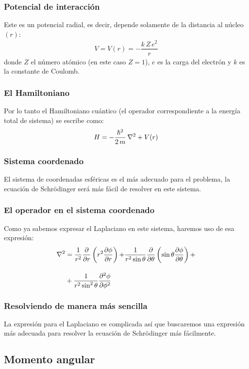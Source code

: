 \documentclass[12pt]{beamer}
\begin{document}
\begin{frame}
\frametitle{Potencial de interacción}
Este es un potencial radial, es decir, depende solamente de la distancia al núcleo $(r)$:
\pause
\begin{align}
V = V (r) = - \dfrac{k \, Z \, e^{2}}{r}
\label{eq:ecuacion_01}
\end{align}
donde $Z$ el número atómico (en este caso $Z=1$), $e$ es la carga del electrón y $k$ es la constante de Coulomb.
\end{frame}
\begin{frame}
\frametitle{El Hamiltoniano}
Por lo tanto el Hamiltoniano cuántico (el operador correspondiente a la energía total de sistema) se escribe como:
\pause
\begin{align}
H = - \dfrac{\hbar^{2}}{2 \, m} \, \laplacian + V (r)
\label{eq:ecuacion_02} 
\end{align}
\end{frame}
\begin{frame}
\frametitle{Sistema coordenado}
El sistema de coordenadas esféricas es el más adecuado para el problema, \pause la ecuación de Schrödinger será más fácil de resolver en este sistema.
\end{frame}
\begin{frame}
\frametitle{El operador en el sistema coordenado}
Como ya sabemos expresar el Laplaciano en este sistema, haremos uso de esa expresión:
\pause
\begin{align*}
\laplacian &= \dfrac{1}{r^{2}} \pdv{r} \left( r^{2} \pdv{\phi}{r} \right) {+} \dfrac{1}{r^{2} \sin \theta} \pdv{\theta} \left( \sin \theta \pdv{\phi}{\theta} \right) {+} \\[1em]
&+ \dfrac{1}{r^{2} \sin^{2} \theta} \pdv[2]{\phi}{\phi} 
\end{align*}
\end{frame}
\begin{frame}
\frametitle{Resolviendo de manera más sencilla}
La expresión para el Laplaciano es complicada así que buscaremos una expresión más adecuada para resolver la ecuación de Schrödinger más fácilmente.
\end{frame}

\subsection{Momento angular}
\end{document}
